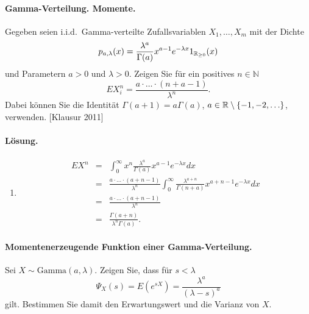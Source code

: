\paragraph{Gamma-Verteilung. Momente.}
Gegeben seien i.i.d.\ Gamma-verteilte Zufallsvariablen $X_1,\ldots,X_m$ mit der Dichte
\begin{equation}
    p_{a,\lambda}(x) = \frac{\lambda^a}{\Gamma(a)}x^{a-1}e^{-\lambda x} 1_{\mathbb R_{\geq 0}}(x)
\end{equation}
und Parametern $a>0$ und $\lambda>0$.
Zeigen Sie für ein positives $n\in\mathbb N$
\begin{equation}
    E X_i^n = \frac{a\cdot\ldots\cdot (n+a-1)}{\lambda^n}.
\end{equation}
Dabei können Sie die Identität 
$\Gamma(a+1)=a \Gamma(a)$, $a\in\mathbb R \setminus \left\{ -1,-2,\ldots \right\}$, verwenden.
[Klausur 2011]

\paragraph*{Lösung.}
\begin{enumerate}
    \item \begin{eqnarray}
            E X^n &=& \int_{0}^{\infty} x^n \frac{\lambda^a}{\Gamma(a)}x^{a-1}e^{-\lambda x} dx \\
            &=& \frac{a \cdot\ldots\cdot \left( a+n-1 \right)}{\lambda^n} 
            \int_{0}^{\infty} \frac{\lambda^{a+n}}{\Gamma(n+a)} x^{a+n-1} e^{-\lambda x} dx \\
            &=& \frac{a\cdot \ldots \cdot \left( a+n-1 \right)}{\lambda^n} \\
            &=& \frac{\Gamma\left( a+n \right)}{ \lambda^n \Gamma\left( a \right)}.
        \end{eqnarray}
\end{enumerate}


\paragraph{Momentenerzeugende Funktion einer Gamma-Verteilung. }
Sei $X \sim \textrm{Gamma}(a, \lambda)$. Zeigen Sie, dass für $s<\lambda$
\begin{equation*}
    \Psi_X(s) = E \left( e^{sX} \right) = \frac{\lambda^a}{ (\lambda-s)^a}
\end{equation*}
gilt. Bestimmen Sie damit den Erwartungswert und die Varianz von $X$. %

